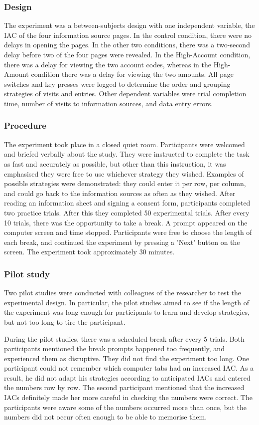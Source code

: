 \subsubsection{Design}
The experiment was a between-subjects design with one independent variable, the IAC of the four information source pages. In the control condition, there were no delays in opening the pages. In the other two conditions, there was a two-second delay before two of the four pages were revealed. In the High-Account condition, there was a delay for viewing the two account codes, whereas in the High-Amount condition there was a delay for viewing the two amounts. All page switches and key presses were logged to determine the order and grouping strategies of visits and entries. Other dependent variables were trial completion time, number of visits to information sources, and data entry errors.

\subsubsection{Procedure}
The experiment took place in a closed quiet room. Participants were welcomed and briefed verbally about the study. They were instructed to complete the task as fast and accurately as possible, but other than this instruction, it was emphasised they were free to use whichever strategy they wished. Examples of possible strategies were demonstrated: they could enter it per row, per column, and could go back to the information sources as often as they wished. After reading an information sheet and signing a consent form, participants completed two practice trials. After this they completed 50 experimental trials. After every 10 trials, there was the opportunity to take a break. A prompt appeared on the computer screen and time stopped. Participants were free to choose the length of each break, and continued the experiment by pressing a 'Next' button on the screen. The experiment took approximately 30 minutes.

\subsubsection{Pilot study}
Two pilot studies were conducted with colleagues of the researcher to test the experimental design. In particular, the pilot studies aimed to see if the length of the experiment was long enough for participants to learn and develop  strategies, but not too long to tire the participant.

During the pilot studies, there was a scheduled break after every 5 trials. Both participants mentioned the break prompts happened too frequently, and experienced them as disruptive. They did not find the experiment too long. One participant could not remember which computer tabs had an increased IAC. As a result, he did not adapt his strategies according to anticipated IACs and entered the numbers row by row. The second participant mentioned that the increased IACs definitely made her more careful in checking the numbers were correct. The participants were aware some of the numbers occurred more than once, but the numbers did not occur often enough to be able to memorise them. 

